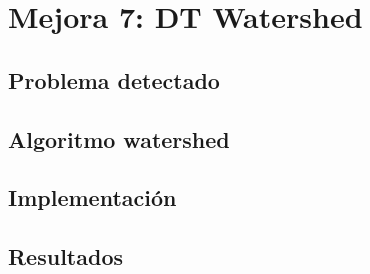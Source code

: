 \chapter{Mejora 7: DT Watershed}\label{dt_watershed}

\section{Problema detectado}\label{sec:dt_watershed_apex_problem}

\section{Algoritmo watershed}\label{sec:dt_watershed_watershed}

\section{Implementación}\label{sec:dt_watershed_implementation}

\section{Resultados}\label{sec:dt_watershed_resultados}
